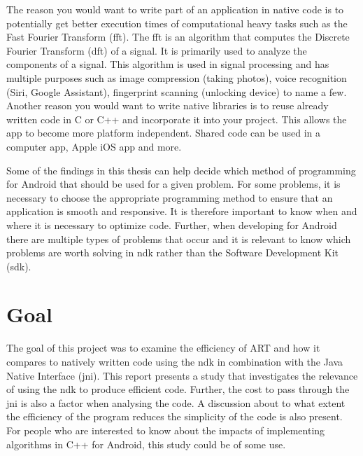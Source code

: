 The reason you would want to write part of an application in native code is to potentially get better execution times of computational heavy tasks such as the Fast Fourier Transform (\gls{fft}). The \gls{fft} is an algorithm that computes the Discrete Fourier Transform (\gls{dft}) of a signal. It is primarily used to analyze the components of a signal. This algorithm is used in signal processing and has multiple purposes such as image compression (taking photos), voice recognition (Siri, Google Assistant), fingerprint scanning (unlocking device) to name a few. Another reason you would want to write native libraries is to reuse already written code in C or C++ and incorporate it into your project. This allows the app to become more platform independent. Shared code can be used in a computer app, Apple iOS app and more.

Some of the findings in this thesis can help decide which method of programming for Android that should be used for a given problem. For some problems, it is necessary to choose the appropriate programming method to ensure that an application is smooth and responsive. It is therefore important to know when and where it is necessary to optimize code. Further, when developing for Android there are multiple types of problems that occur and it is relevant to know which problems are worth solving in \gls{ndk} rather than the Software Development Kit (\gls{sdk}).

\section{Goal}
The goal of this project was to examine the efficiency of ART and how it compares to natively written code using the \gls{ndk} in combination with the Java Native Interface (\gls{jni}). This report presents a study that investigates the relevance of using the \gls{ndk} to produce efficient code. Further, the cost to pass through the \gls{jni} is also a factor when analysing the code. A discussion about to what extent the efficiency of the program reduces the simplicity of the code is also present. For people who are interested to know about the impacts of implementing algorithms in C++ for Android, this study could be of some use.

